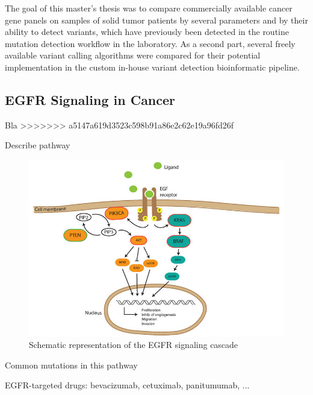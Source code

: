 The goal of this master's thesis was to compare commercially available cancer
gene panels on samples of solid tumor patients by several parameters and by
their ability to detect variants, which have previously been detected in the
routine mutation detection workflow in the laboratory. As a second part, several
freely available variant calling algorithms were compared for their potential
implementation in the custom in-house variant detection bioinformatic pipeline.

\subsection{EGFR Signaling in Cancer}

Bla {\cite{targeting_egfr:2012}}
>>>>>>> a5147a619d3523c598b91a86e2c62e19a96fd26f

Describe pathway

\begin{figure}[ht]
  \begin{center}
    \includegraphics[scale=1,angle=0]{egfr_signaling.png}
    \caption{Schematic representation of the EGFR signaling cascade {\cite{targeting_egfr:2012}}}
    \label{Fig:egfr_signaling}
  \end{center}
\end{figure}

Common mutations in this pathway

EGFR-targeted drugs:
bevacizumab, cetuximab, panitumumab, ...

